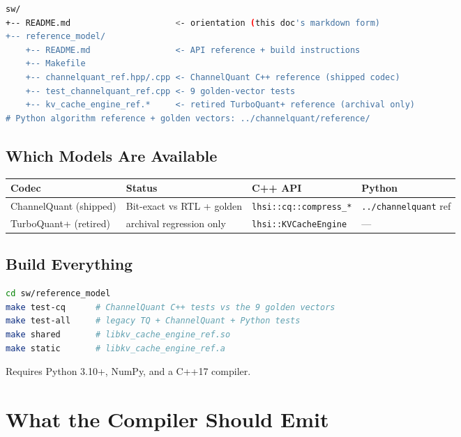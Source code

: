 \documentclass[11pt]{article}
\begin{document}
\begin{lstlisting}[language=bash]
sw/
+-- README.md                     <- orientation (this doc's markdown form)
+-- reference_model/
    +-- README.md                 <- API reference + build instructions
    +-- Makefile
    +-- channelquant_ref.hpp/.cpp <- ChannelQuant C++ reference (shipped codec)
    +-- test_channelquant_ref.cpp <- 9 golden-vector tests
    +-- kv_cache_engine_ref.*     <- retired TurboQuant+ reference (archival only)
# Python algorithm reference + golden vectors: ../channelquant/reference/
\end{lstlisting}

\subsection{Which Models Are Available}

\begin{table}[h]
\centering
\small
\begin{tabular}{@{}l l l l@{}}
\toprule
Codec & Status & C++ API & Python \\
\midrule
ChannelQuant (shipped) & Bit-exact vs RTL + golden & \texttt{lhsi::cq::compress\_*} & \texttt{../channelquant} ref \\
TurboQuant+ (retired) & archival regression only & \texttt{lhsi::KVCacheEngine} & --- \\
\bottomrule
\end{tabular}
\end{table}

\subsection{Build Everything}

\begin{lstlisting}[language=bash]
cd sw/reference_model
make test-cq      # ChannelQuant C++ tests vs the 9 golden vectors
make test-all     # legacy TQ + ChannelQuant + Python tests
make shared       # libkv_cache_engine_ref.so
make static       # libkv_cache_engine_ref.a
\end{lstlisting}

\noindent Requires Python 3.10+, NumPy, and a C++17 compiler.

\section{What the Compiler Should Emit}
\end{document}
